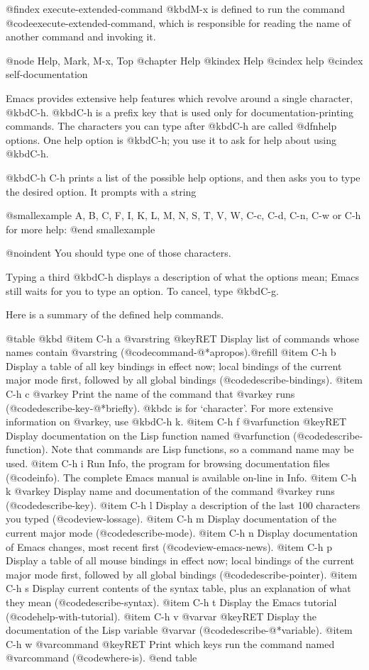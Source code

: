 {{@findex execute-extended-command
  @kbd{M-x} is defined to run the command @code{execute-extended-command},
which is responsible for reading the name of another command and invoking
it.

@node Help, Mark, M-x, Top
@chapter Help
@kindex Help
@cindex help
@cindex self-documentation

  Emacs provides extensive help features which revolve around a single
character, @kbd{C-h}.  @kbd{C-h} is a prefix key that is used only for
documentation-printing commands.  The characters you can type after
@kbd{C-h} are called @dfn{help options}.  One help option is @kbd{C-h};
you use it to ask for help about using @kbd{C-h}.

  @kbd{C-h C-h} prints a list of the possible help options, and then asks
you to type the desired option.  It prompts with a string

@smallexample
A, B, C, F, I, K, L, M, N, S, T, V, W, C-c, C-d, C-n, C-w or C-h for more help:
@end smallexample

@noindent
You should type one of those characters.

  Typing a third @kbd{C-h} displays a description of what the options mean;
Emacs still waits for you to type an option.  To cancel, type @kbd{C-g}.

  Here is a summary of the defined help commands.

@table @kbd
@item C-h a @var{string} @key{RET}
Display list of commands whose names contain @var{string}
(@code{command-@*apropos}).@refill
@item C-h b
Display a table of all key bindings in effect now; local bindings of
the current major mode first, followed by all global bindings
(@code{describe-bindings}).
@item C-h c @var{key}
Print the name of the command that @var{key} runs (@code{describe-key-@*briefly}).
@kbd{c} is for `character'.  For more extensive information on @var{key},
use @kbd{C-h k}.
@item C-h f @var{function} @key{RET}
Display documentation on the Lisp function named @var{function}
(@code{describe-function}).  Note that commands are Lisp functions, so
a command name may be used.
@item C-h i
Run Info, the program for browsing documentation files (@code{info}).
The complete Emacs manual is available on-line in Info.
@item C-h k @var{key}
Display name and documentation of the command @var{key} runs (@code{describe-key}).
@item C-h l
Display a description of the last 100 characters you typed
(@code{view-lossage}).
@item C-h m
Display documentation of the current major mode (@code{describe-mode}).
@item C-h n
Display documentation of Emacs changes, most recent first
(@code{view-emacs-news}).
@item C-h p
Display a table of all mouse bindings in effect now; local bindings
of the current major mode first, followed by all global bindings
(@code{describe-pointer}).
@item C-h s
Display current contents of the syntax table, plus an explanation of
what they mean (@code{describe-syntax}).
@item C-h t
Display the Emacs tutorial (@code{help-with-tutorial}).
@item C-h v @var{var} @key{RET}
Display the documentation of the Lisp variable @var{var}
(@code{describe-@*variable}).
@item C-h w @var{command} @key{RET}
Print which keys run the command named @var{command} (@code{where-is}).
@end table

}}
